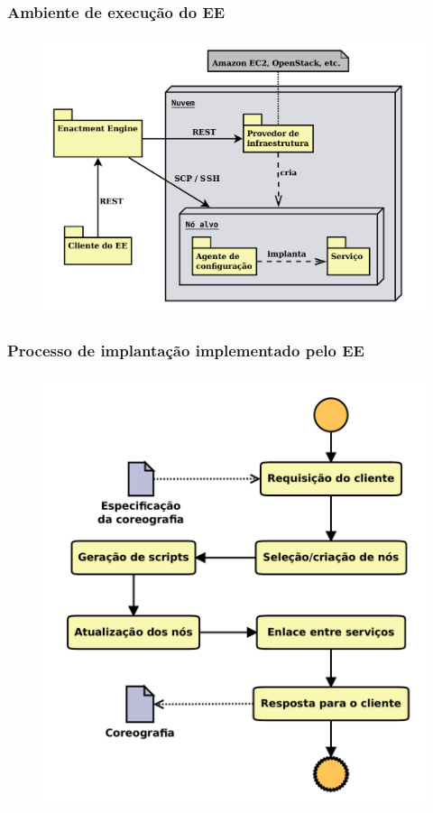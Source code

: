 \documentclass{beamer}
\begin{document}
\begin{frame}
\frametitle{Ambiente de execução do EE}

\begin{figure}
\includegraphics[width=0.8\linewidth]{img/arquitetura}
\end{figure}

\end{frame}


\begin{frame}
\frametitle{Processo de implantação implementado pelo EE}

\begin{figure}
\includegraphics[width=0.55\linewidth]{img/processo}
\end{figure}

\end{frame}

\end{document}
